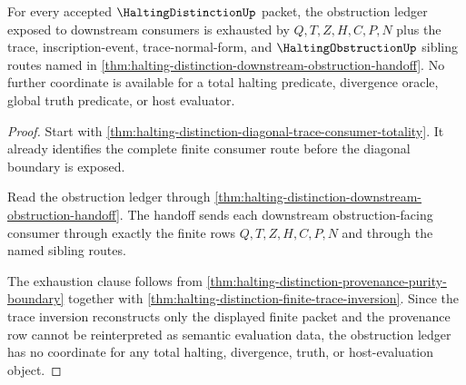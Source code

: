 \begin{theorem}
\label{thm:halting-distinction-finite-obstruction-ledger-exhaustion}
For every accepted $\HaltingDistinctionUp$ packet, the obstruction ledger exposed to downstream consumers is exhausted by $Q,T,Z,H,C,P,N$ plus the trace, inscription-event, trace-normal-form, and $\HaltingObstructionUp$ sibling routes named in \autoref{thm:halting-distinction-downstream-obstruction-handoff}. No further coordinate is available for a total halting predicate, divergence oracle, global truth predicate, or host evaluator.
\end{theorem}
\begin{proof}
Start with \autoref{thm:halting-distinction-diagonal-trace-consumer-totality}. It already identifies the complete finite consumer route before the diagonal boundary is exposed.

Read the obstruction ledger through \autoref{thm:halting-distinction-downstream-obstruction-handoff}. The handoff sends each downstream obstruction-facing consumer through exactly the finite rows $Q,T,Z,H,C,P,N$ and through the named sibling routes.

The exhaustion clause follows from \autoref{thm:halting-distinction-provenance-purity-boundary} together with \autoref{thm:halting-distinction-finite-trace-inversion}. Since the trace inversion reconstructs only the displayed finite packet and the provenance row cannot be reinterpreted as semantic evaluation data, the obstruction ledger has no coordinate for any total halting, divergence, truth, or host-evaluation object.
\end{proof}


